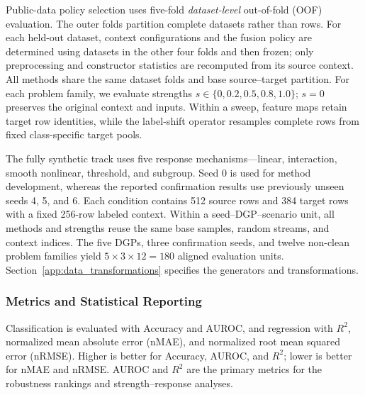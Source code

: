 Public-data policy selection uses five-fold \emph{dataset-level} out-of-fold
(OOF) evaluation. The outer folds partition complete datasets rather than rows.
For each held-out dataset, context configurations and the fusion policy are
determined using datasets in the other four folds and then frozen; only
preprocessing and constructor statistics are recomputed from its source context.
All methods share the same dataset folds and base source--target partition.
For each problem family, we evaluate strengths
$s\in\{0,0.2,0.5,0.8,1.0\}$; $s=0$ preserves the original context and inputs.
Within a sweep, feature maps retain target row identities, while the label-shift
operator resamples complete rows from fixed class-specific target pools.

The fully synthetic track uses five response mechanisms---linear,
interaction, smooth nonlinear, threshold, and subgroup.  Seed 0 is used for
method development, whereas the reported confirmation results use previously
unseen seeds 4, 5, and 6.  Each condition contains 512 source rows and 384
target rows with a fixed 256-row labeled context.  Within a
seed--DGP--scenario unit, all methods and strengths reuse the same base samples,
random streams, and context indices.  The five DGPs, three confirmation seeds,
and twelve non-clean problem families yield $5\times3\times12=180$ aligned
evaluation units.  Section~\ref{app:data_transformations} specifies the
generators and transformations.

\subsubsection{Metrics and Statistical Reporting}
\label{app:metrics_reporting}

Classification is evaluated with Accuracy and AUROC, and regression with
$R^2$, normalized mean absolute error (nMAE), and normalized root mean squared
error (nRMSE).  Higher is better for Accuracy, AUROC, and $R^2$; lower is
better for nMAE and nRMSE.  AUROC and $R^2$ are the primary metrics for the
robustness rankings and strength--response analyses.

